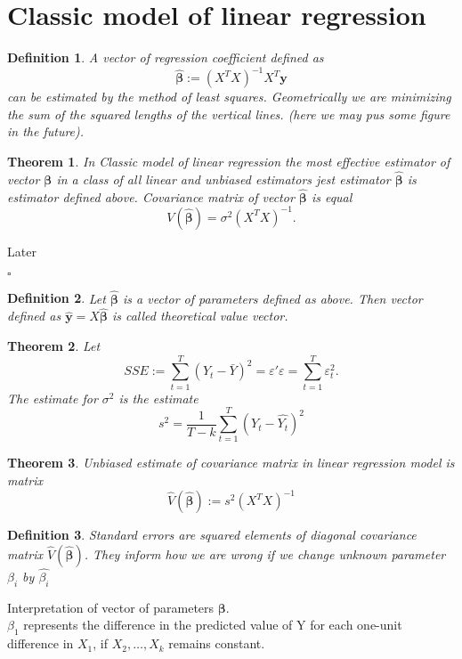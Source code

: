 \documentclass{book}
\newtheorem{definition}{Definition}[section]
\newtheorem{theorem}{Theorem}[section]
\newenvironment{proof}
{{\bf Proof. }}{\begin{flushright}$\square$\end{flushright}}
\begin{document}
\section{Classic model of linear regression}
\begin{definition}
A vector of regression coefficient defined as
$$
\hat{\pmb{\beta}}:=(X^{T}X)^{-1}X^{T}\mathbf{y}
$$
can be estimated by the method of least squares. Geometrically we are minimizing the sum of the squared lengths of the vertical lines. (here we may pus some figure in the future).
\end{definition}
\begin{theorem}
In Classic model of linear regression the most effective estimator of vector $\pmb{\beta}$ in a class of all linear and unbiased estimators jest estimator $\hat{\pmb{\beta}}$ is estimator defined above. Covariance matrix of vector $\hat{\pmb{\beta}}$ is equal 
$$
V(\hat{\pmb{\beta}})=\sigma^{2}(X^{T}X)^{-1}.
$$ 
\end{theorem}
\begin{proof}
Later
\end{proof}
\begin{definition}
Let $\hat{\pmb{\beta}}$ is a vector of parameters defined as above. Then vector defined as $\mathbf{\hat{y}}=X\hat{\pmb{\beta}}$ is called theoretical value vector.
\end{definition}
\begin{theorem}
Let 
$$
SSE:=\sum_{t=1}^{T}(Y_{t}-\bar{Y})^{2}=\varepsilon'\varepsilon=\sum_{t=1}^{T}\varepsilon_{t}^{2}. 
$$
The estimate for $\sigma^{2}$ is the estimate
\begin{equation}
\nonumber
s^{2}=\frac{1}{T-k}\sum_{t=1}^{T}(Y_{t}-\hat{Y_{t}})^{2}
\end{equation}
\end{theorem}
\begin{theorem}
Unbiased estimate of covariance matrix in linear regression model is matrix
\begin{equation}
\nonumber
\hat{V}(\hat{\pmb{\beta}}):=s^{2}(X^{T}X)^{-1}
\end{equation}
\end{theorem}
\begin{definition}
Standard errors are squared elements of diagonal covariance matrix $\hat{V}(\hat{\pmb{\beta}})$. They inform how we are wrong if we change unknown parameter $\beta_{i}$ by $\hat{\beta_{i}}$
\end{definition}
Interpretation of vector of parameters $\pmb{\beta}$.\\
$\beta_{1}$ represents the difference in the predicted value of Y for each one-unit difference in $X_{1}$, if $X_{2},\dots,X_{k}$ remains constant.
\end{document}

